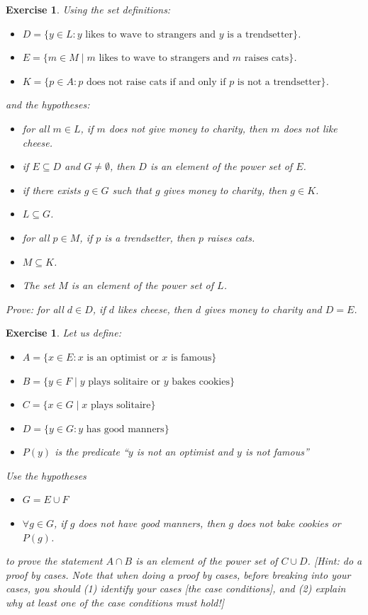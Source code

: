 \documentclass{book}
\newcounter{ekcounter}%
\theoremstyle{ekimcustom}
\newtheorem{exercise}[ekcounter]{Exercise}
\begin{document}
\begin{exercise}
Using the set definitions:
\begin{itemize}
\item  $D = \{y \in L : y \text{ likes to wave to strangers and } y \text{ is a trendsetter}\}$.
\item $E = \{m \in M \mid m \text{ likes to wave to strangers and } m \text{ raises cats}\}$.  
\item $K = \{p \in A : p \text{ does not raise cats if and only if } p \text{ is not a trendsetter}\}$. 
\end{itemize}
and the hypotheses:
\begin{itemize}
\item for all $m \in L$, if $m$ does not give money to charity, then $m$ does not like cheese.
\item if $E \subseteq D$ and $G \not= \emptyset$, then $D$ is an element of the power set of $E$.
\item if there exists $g \in G$ such that $g$ gives money to charity, then $g \in K$.
\item $L \subseteq G$.
\item for all $p \in M$, if $p$ is a trendsetter, then $p$ raises cats.
\item $M \subseteq K$.
\item The set $M$ is an element of the power set of $L$.
\end{itemize}
Prove: for all $d \in D$, if $d$ likes cheese, then $d$ gives money to charity and $D=E$.
\end{exercise}

\begin{exercise}
Let us define:
\begin{itemize}
\item $A=\{x \in E : x \text{ is an optimist or } x \text{ is famous}\}$
\item $B=\{y \in F \mid y \text{ plays solitaire  or } y \text{ bakes cookies}\}$
\item $C=\{x \in G \mid x \text{ plays solitaire}\}$
\item $D=\{y \in G : y \text{ has good manners}\}$
\item $P(y)$ is the predicate ``$y$ is not an optimist and $y$ is not famous''
\end{itemize}
Use the hypotheses
\begin{itemize}
\item $G = E \cup F$
\item $\forall g \in G$, if $g$ does not have good manners, then $g$ does not bake cookies or $P(g)$.
\end{itemize}
to prove the statement $A \cap B$ is an element of the power set of $C \cup D$. [Hint: do a proof by cases. Note that when doing a proof by cases, before breaking into your cases, you should (1) identify your cases [the case conditions], and (2) explain why at \emph{least} one of the case conditions must hold!]
\end{exercise}
\end{document}
